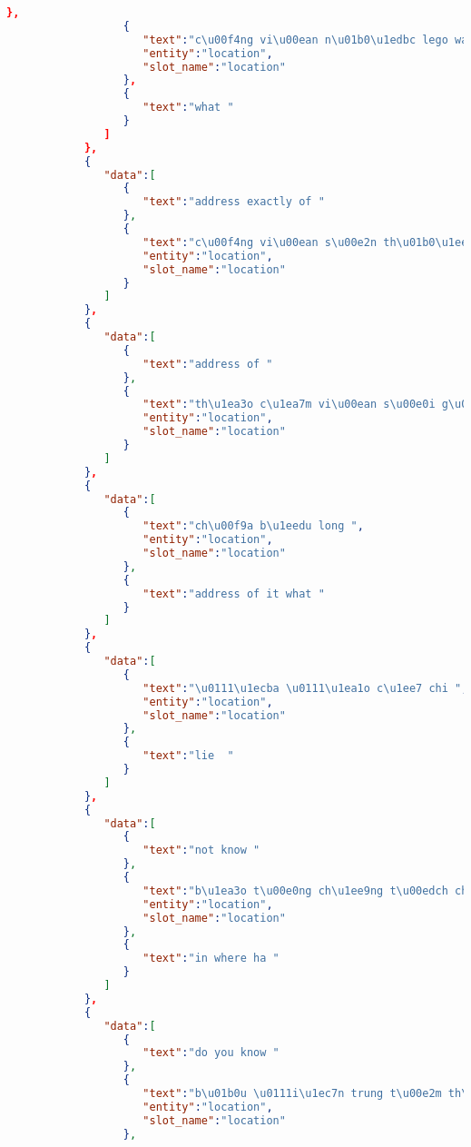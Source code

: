 \begin{lstlisting}[language=json,firstnumber=1]
                  },
                  {
                     "text":"c\u00f4ng vi\u00ean n\u01b0\u1edbc lego water park ",
                     "entity":"location",
                     "slot_name":"location"
                  },
                  {
                     "text":"what "
                  }
               ]
            },
            {
               "data":[
                  {
                     "text":"address exactly of "
                  },
                  {
                     "text":"c\u00f4ng vi\u00ean s\u00e2n th\u01b0\u1ee3ng sky park vivo city ",
                     "entity":"location",
                     "slot_name":"location"
                  }
               ]
            },
            {
               "data":[
                  {
                     "text":"address of "
                  },
                  {
                     "text":"th\u1ea3o c\u1ea7m vi\u00ean s\u00e0i g\u00f2n ",
                     "entity":"location",
                     "slot_name":"location"
                  }
               ]
            },
            {
               "data":[
                  {
                     "text":"ch\u00f9a b\u1eedu long ",
                     "entity":"location",
                     "slot_name":"location"
                  },
                  {
                     "text":"address of it what "
                  }
               ]
            },
            {
               "data":[
                  {
                     "text":"\u0111\u1ecba \u0111\u1ea1o c\u1ee7 chi ",
                     "entity":"location",
                     "slot_name":"location"
                  },
                  {
                     "text":"lie  "
                  }
               ]
            },
            {
               "data":[
                  {
                     "text":"not know "
                  },
                  {
                     "text":"b\u1ea3o t\u00e0ng ch\u1ee9ng t\u00edch chi\u1ebfn tranh tp h\u1ed3 ch\u00ed minh ",
                     "entity":"location",
                     "slot_name":"location"
                  },
                  {
                     "text":"in where ha "
                  }
               ]
            },
            {
               "data":[
                  {
                     "text":"do you know "
                  },
                  {
                     "text":"b\u01b0u \u0111i\u1ec7n trung t\u00e2m th\u00e0nh ph\u1ed1 h\u1ed3 ch\u00ed minh ",
                     "entity":"location",
                     "slot_name":"location"
                  },

\end{lstlisting}
